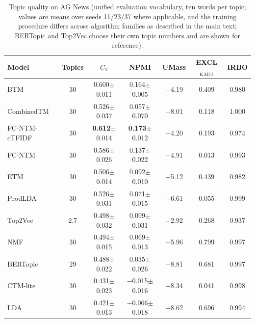 \documentclass[11pt]{article}
\newcommand{\fcntm}{FC-NTM}
\begin{document}
\begin{table}[t]
\centering
\caption{Topic quality on AG News (unified evaluation vocabulary, ten words per topic; values are means over seeds 11/23/37 where applicable, and the training procedure differs across algorithm families as described in the main text; BERTopic and Top2Vec choose their own topic numbers and are shown for reference).}
\label{tab:agnews}
\small
\begin{tabular}{lcccccc}
\toprule
Model & Topics & $C_V$ & NPMI & UMass & EXCL$_{\mathrm{KADJ}}$ & IRBO \\
\midrule
BTM & 30 & 0.600$\pm$0.011 & 0.164$\pm$0.005 & $-$4.19 & 0.409 & 0.980 \\
CombinedTM & 30 & 0.526$\pm$0.037 & 0.057$\pm$0.070 & $-$8.01 & 0.118 & 1.000 \\
\fcntm{}-cTFIDF & 30 & \textbf{0.612}$\pm$0.014 & \textbf{0.173}$\pm$0.012 & $-$4.20 & 0.193 & 0.974 \\
\fcntm{} & 30 & 0.586$\pm$0.026 & 0.137$\pm$0.022 & $-$4.91 & 0.013 & 0.993 \\
ETM & 30 & 0.506$\pm$0.014 & 0.092$\pm$0.010 & $-$5.12 & 0.439 & 0.982 \\
ProdLDA & 30 & 0.526$\pm$0.031 & 0.071$\pm$0.015 & $-$6.61 & 0.055 & 0.999 \\
Top2Vec & 2.7 & 0.498$\pm$0.032 & 0.099$\pm$0.031 & $-$2.92 & 0.268 & 0.937 \\
NMF & 30 & 0.494$\pm$0.015 & 0.069$\pm$0.013 & $-$5.96 & 0.799 & 0.997 \\
BERTopic & 29 & 0.488$\pm$0.022 & 0.035$\pm$0.026 & $-$8.81 & 0.681 & 0.997 \\
CTM-lite & 30 & 0.431$\pm$0.023 & $-$0.015$\pm$0.016 & $-$8.34 & 0.041 & 0.998 \\
LDA & 30 & 0.421$\pm$0.013 & $-$0.066$\pm$0.018 & $-$8.62 & 0.696 & 0.994 \\
\bottomrule
\end{tabular}
\end{table}
\end{document}
